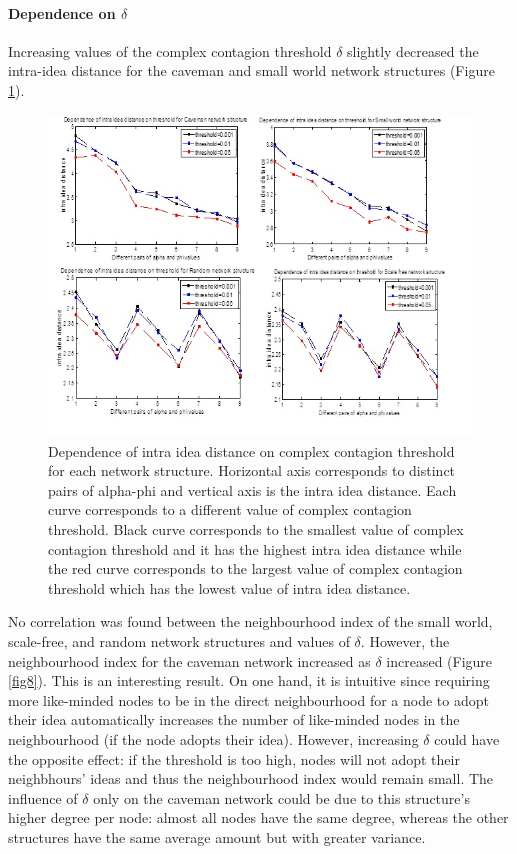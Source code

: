 \documentclass{beamer}
\begin{document}
\begin{frame}
\paragraph{Dependence on $\delta$}
Increasing values of the complex contagion threshold $\delta$ slightly decreased the intra-idea distance for the caveman and small world network structures (Figure \ref{fig7}). 

\begin{figure}
[htp]
\begin{center}
\includegraphics{Fig7}
\end{center}
\caption{Dependence of intra idea distance on complex contagion threshold for each network structure. Horizontal axis corresponds to distinct pairs of alpha-phi and   vertical axis is the intra idea distance. Each curve corresponds to a different value of complex contagion threshold. Black curve corresponds to the smallest value of complex contagion threshold and it has the highest intra idea distance while the red curve corresponds to the largest value of complex contagion threshold which has the lowest value of intra idea distance.}
\label {fig7}
\end{figure}

No correlation was found between the neighbourhood index of the small world, scale-free, and random network structures and values of $\delta$. However, the neighbourhood index for the caveman network increased as $\delta$ increased (Figure \ref{fig8}). This is an interesting result. On one hand, it is intuitive since requiring more like-minded nodes to be in the direct neighbourhood for a node to adopt their idea automatically increases the number of like-minded nodes in the neighbourhood (if the node adopts their idea). However, increasing $\delta$ could have the opposite effect: if the threshold is too high, nodes will not adopt their neighbhours' ideas and thus the neighbourhood index would remain small. The influence of $\delta$ only on the caveman network could be due to this structure's higher degree per node: almost all nodes have the same degree, whereas the other structures have the same average amount but with greater variance.


\end{frame}
\end{document}
